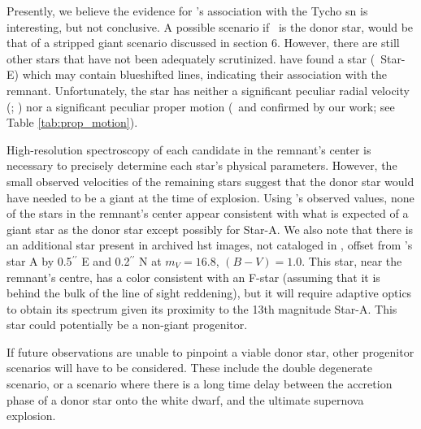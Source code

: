 Presently, we believe the evidence for \starg's association with the Tycho \gls{sn} is interesting, but not conclusive.
A possible scenario if \starg\ is the donor star, would be that of a stripped giant scenario discussed in section 6.  
However, there are still other stars that have not been adequately
scrutinized. \citet{2007PASJ...59..811I} have found a star (\rl\
Star-E) which may contain blueshifted  lines, indicating their
association with the remnant. Unfortunately, the star has neither
a significant peculiar radial velocity (\citealt{2007PASJ...59..811I}; \rl)
 nor a significant peculiar proper motion (\rl\ and confirmed by
our work; see Table \ref{tab:prop_motion}).

High-resolution spectroscopy of each candidate in the remnant's center is necessary to
precisely determine each star's physical parameters. However, the small observed
velocities of the remaining stars suggest that the donor star would
have needed to be a giant at the time of explosion. Using \rl's
observed values, none of the stars in the remnant's center appear
consistent with what is expected of a giant star as the donor star
except possibly for Star-A.  We also note that there is an additional
star present in archived \gls{hst} images, not cataloged in \rl, offset from \rl's star A  by
0.5$^{\prime\prime}$ E and 0.2$^{\prime\prime}$ N at $m_V=16.8$,
$(B-V)=1.0$. This star, near the remnant's centre, has a color
consistent with an F-star (assuming that it is behind the bulk of the
line of sight reddening), but it will require adaptive optics to
obtain its spectrum given its proximity to the 13th magnitude Star-A. This star could potentially be a non-giant
progenitor.

If future observations are unable to pinpoint a viable donor star,
other progenitor scenarios will have to be considered. These include
the double degenerate scenario, or a scenario where there is a long
time delay between the accretion phase of a donor star onto the white dwarf, and the ultimate supernova
explosion.

